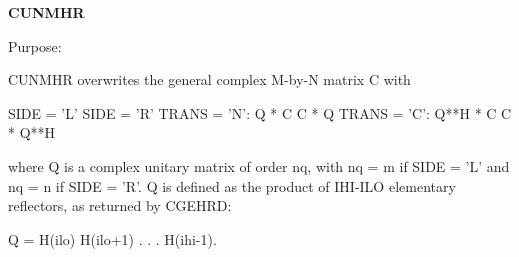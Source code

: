 {\bfseries C\+U\+N\+M\+H\+R} 

 \begin{DoxyParagraph}{Purpose\+: }
\begin{DoxyVerb} CUNMHR overwrites the general complex M-by-N matrix C with

                 SIDE = 'L'     SIDE = 'R'
 TRANS = 'N':      Q * C          C * Q
 TRANS = 'C':      Q**H * C       C * Q**H

 where Q is a complex unitary matrix of order nq, with nq = m if
 SIDE = 'L' and nq = n if SIDE = 'R'. Q is defined as the product of
 IHI-ILO elementary reflectors, as returned by CGEHRD:

 Q = H(ilo) H(ilo+1) . . . H(ihi-1).\end{DoxyVerb}
 
\end{DoxyParagraph}

